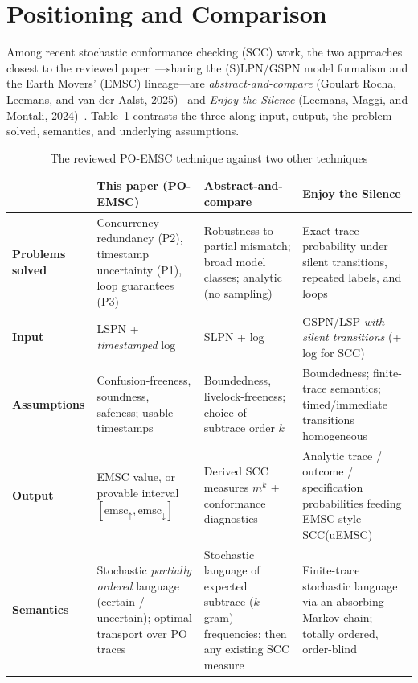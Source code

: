 \section{Positioning and Comparison}

Among recent stochastic conformance checking (SCC) work, the two approaches
closest to the reviewed paper~\cite{poemsc}---sharing the (S)LPN/GSPN model
formalism and the Earth Movers' (EMSC) lineage---are \emph{abstract-and-compare}
(Goulart Rocha, Leemans, and van der Aalst, 2025)~\cite{abscompare} and
\emph{Enjoy the Silence} (Leemans, Maggi, and Montali, 2024)~\cite{silence}.
Table~\ref{tab:cmp}
contrasts the three along input, output, the problem solved, semantics, and
underlying assumptions.

\renewcommand{\arraystretch}{1.2}
\setlength{\tabcolsep}{3.5pt}
\begin{table}[h]
\centering
\footnotesize
\begin{tabular}{@{}p{2cm}p{3cm}p{3cm}p{3cm}@{}}
\hline
 & \textbf{This paper (PO-EMSC)} & \textbf{Abstract-and-compare} & \textbf{Enjoy the Silence} \\
\hline
\textbf{Problems solved} &
Concurrency redundancy (P2), timestamp uncertainty (P1), loop guarantees (P3) &
Robustness to partial mismatch; broad model classes; analytic (no sampling) &
Exact trace probability under silent transitions, repeated labels, and loops \\
\textbf{Input} &
LSPN + \emph{timestamped} log &
SLPN + log &
GSPN/LSP \emph{with silent transitions} (+ log for SCC) \\
\textbf{Assumptions} &
Confusion-freeness, soundness, safeness; usable timestamps &
Boundedness, livelock-freeness; choice of subtrace order \(k\) &
Boundedness; finite-trace semantics; timed/immediate transitions homogeneous \\
\textbf{Output} &
EMSC value, or provable interval \([\mathrm{emsc}_{\uparrow},\mathrm{emsc}_{\downarrow}]\) &
Derived SCC measures \(m^{k}\) + conformance diagnostics &
Analytic trace / outcome / specification probabilities feeding EMSC-style SCC(uEMSC) \\

\textbf{Semantics} &
Stochastic \emph{partially ordered} language (certain / uncertain); optimal transport over PO traces &
Stochastic language of expected subtrace (\(k\)-gram) frequencies; then any existing SCC measure &
Finite-trace stochastic language via an absorbing Markov chain; totally ordered, order-blind \\
\hline
\end{tabular}
\caption{The reviewed PO-EMSC technique against two other techniques}
\label{tab:cmp}
\end{table}

